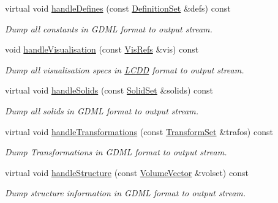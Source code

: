 \begin{DoxyCompactItemize}
virtual void \hyperlink{class_d_d4hep_1_1_geometry_1_1_simple_g_d_m_l_writer_a5880f6b194754a31ae10ba2bcab27cc4}{handle\+Defines} (const \hyperlink{class_d_d4hep_1_1_geometry_1_1_geo_handler_types_a960cd930e1a491fc9a6afa5058865b4e}{Definition\+Set} \&defs) const
\begin{DoxyCompactList}\small\item\em Dump all constants in G\+D\+ML format to output stream. \end{DoxyCompactList}\item 
void \hyperlink{class_d_d4hep_1_1_geometry_1_1_simple_g_d_m_l_writer_a0455532c28daf3d1ffca21f96f4007e1}{handle\+Visualisation} (const \hyperlink{class_d_d4hep_1_1_geometry_1_1_geo_handler_types_abeb370eb52c06e48c61e6c8bc19b66ab}{Vis\+Refs} \&vis) const
\begin{DoxyCompactList}\small\item\em Dump all visualisation specs in \hyperlink{class_d_d4hep_1_1_geometry_1_1_l_c_d_d}{L\+C\+DD} format to output stream. \end{DoxyCompactList}\item 
virtual void \hyperlink{class_d_d4hep_1_1_geometry_1_1_simple_g_d_m_l_writer_a5131f9aae36a36034d1cd9d7c783dba9}{handle\+Solids} (const \hyperlink{class_d_d4hep_1_1_geometry_1_1_geo_handler_types_a85d065cdf670a4f9ea9c0c4dee921fce}{Solid\+Set} \&solids) const
\begin{DoxyCompactList}\small\item\em Dump all solids in G\+D\+ML format to output stream. \end{DoxyCompactList}\item 
virtual void \hyperlink{class_d_d4hep_1_1_geometry_1_1_simple_g_d_m_l_writer_ad664ba2864513899c1e6a9fe4aa5e8c1}{handle\+Transformations} (const \hyperlink{class_d_d4hep_1_1_geometry_1_1_geo_handler_types_aa52b3113e87db04c37666e85a9b5e569}{Transform\+Set} \&trafos) const
\begin{DoxyCompactList}\small\item\em Dump Transformations in G\+D\+ML format to output stream. \end{DoxyCompactList}\item 
virtual void \hyperlink{class_d_d4hep_1_1_geometry_1_1_simple_g_d_m_l_writer_a88417b920fda18350a8e8af662c48375}{handle\+Structure} (const \hyperlink{class_d_d4hep_1_1_geometry_1_1_geo_handler_types_a6713619ef278692ebdf9f6ee4a3f32de}{Volume\+Vector} \&volset) const
\begin{DoxyCompactList}\small\item\em Dump structure information in G\+D\+ML format to output stream. \end{DoxyCompactList}\end{DoxyCompactItemize}
